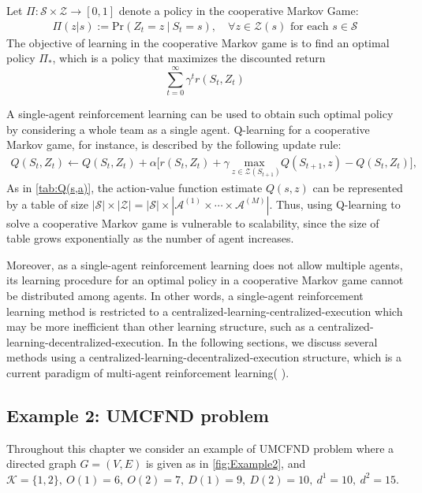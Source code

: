 Let $\Pi: \mathcal{S} \times \mathcal{Z} \rightarrow [0,1]$ denote a policy in the cooperative Markov Game:
\begin{align}
 \Pi(z|s):= \text{Pr}(Z_t = z \ | \ S_t = s), \quad \forall z \in \mathcal{Z}(s) \text{ for each } s\in \mathcal{S}
\end{align}
The objective of learning in the cooperative Markov game is to find an optimal policy $\Pi_\ast$, which is a policy that maximizes the discounted return $$\sum_{t=0}^\infty \gamma^t r(S_t,Z_t)$$

A single-agent reinforcement learning can be used to obtain such optimal policy by considering a whole team as a single agent. Q-learning for a cooperative Markov game, for instance, is described by the following update rule:
\begin{align}
    Q(S_t, Z_t) \leftarrow Q(S_t, Z_t) + \alpha\big[ r(S_t, Z_t) + \gamma \ \underset{z\in\mathcal{Z}(S_{t+1})}{\text{max }}Q(S_{t+1}, z) - Q(S_t, Z_t)\big],
\end{align}
As in \autoref{tab:Q(s,a)}, the action-value function estimate $Q(s,z)$ can be represented by a table of size $|\mathcal{S}| \times |\mathcal{Z}| = |\mathcal{S}| \times |\mathcal{A}^{(1)} \times \cdots \times \mathcal{A}^{(M)}|$. Thus, using Q-learning to solve a cooperative Markov game is vulnerable to scalability, since the size of table grows exponentially as the number of agent increases.

Moreover, as a single-agent reinforcement learning does not allow multiple agents, its learning procedure for an optimal policy in a  cooperative Markov game cannot be distributed among agents. In other words, a single-agent reinforcement learning method is restricted to a centralized-learning-centralized-execution which may be more inefficient than other learning structure, such as a centralized-learning-decentralized-execution. In the following sections, we discuss several methods using a centralized-learning-decentralized-execution structure, which is a current paradigm of multi-agent reinforcement learning(\citeauthor{zhang2019multi} \cite{zhang2019multi}).

\subsection{Example 2: UMCFND problem}
Throughout this chapter we consider an example of UMCFND problem where a directed graph $G = (V,E)$ is given as in \autoref{fig:Example2}, and $\mathcal{K} = \{1,2\}, \ O(1) = 6, \ O(2) = 7, \ D(1) = 9, \ D(2) = 10, \ d^1 = 10, \ d^2 = 15$.

